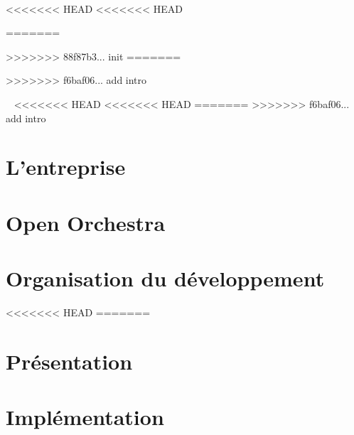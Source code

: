 \documentclass[a4paper, 12pt]{report}
\begin{document}
\newcommand{\HRule}{\rule{\linewidth}{0.5mm}}



~
\thispagestyle{empty}

<<<<<<< HEAD
<<<<<<< HEAD
% 

=======
 

>>>>>>> 88f87b3... init
=======
% 

>>>>>>> f6baf06... add intro
\tableofcontents
\thispagestyle{empty}
\setcounter{page}{0}

\renewcommand{\arraystretch}{1.5}


~
\thispagestyle{empty}
\setcounter{page}{0}
\newpage
<<<<<<< HEAD
<<<<<<< HEAD
=======
>>>>>>> f6baf06... add intro

\part{L'entreprise}

\part{Open Orchestra}
\part{Organisation du développement}
<<<<<<< HEAD
=======

\part{Présentation}
    

    

    

\part{Implémentation}
    

    

    

    
\end{document}
